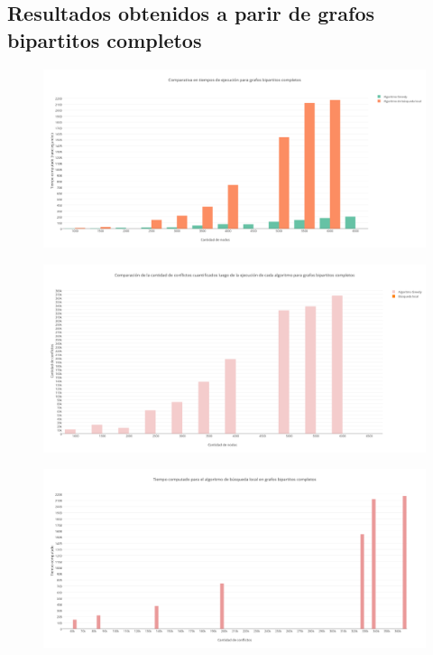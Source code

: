 \subsection {Resultados obtenidos a parir de grafos bipartitos completos}

\begin{figure}[H]
  \centering
  \includegraphics[width=18cm]{imagenes/Ej5/bipartitosCompletos/TiemposGreedyBL.png}
  \caption{}
    \label{}
\end{figure}

\begin{figure}[H]
  \centering
  \includegraphics[width=18cm]{imagenes/Ej5/bipartitosCompletos/ConflictosGreedyBL.png}
  \caption{}
    \label{}
\end{figure}

\begin{figure}[H]
  \centering
  \includegraphics[width=18cm]{imagenes/Ej5/bipartitosCompletos/ConfTiempoBL.png}
  \caption{}
    \label{}
\end{figure}
